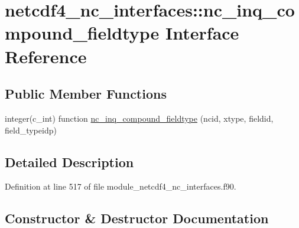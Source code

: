 \hypertarget{interfacenetcdf4__nc__interfaces_1_1nc__inq__compound__fieldtype}{}\section{netcdf4\+\_\+nc\+\_\+interfaces\+:\+:nc\+\_\+inq\+\_\+compound\+\_\+fieldtype Interface Reference}
\label{interfacenetcdf4__nc__interfaces_1_1nc__inq__compound__fieldtype}
\subsection*{Public Member Functions}
\begin{DoxyCompactItemize}
\item 
integer(c\+\_\+int) function \hyperlink{interfacenetcdf4__nc__interfaces_1_1nc__inq__compound__fieldtype_a01257488d89e470d1e3a7f025c80dd27}{nc\+\_\+inq\+\_\+compound\+\_\+fieldtype} (ncid, xtype, fieldid, field\+\_\+typeidp)
\end{DoxyCompactItemize}


\subsection{Detailed Description}


Definition at line 517 of file module\+\_\+netcdf4\+\_\+nc\+\_\+interfaces.\+f90.



\subsection{Constructor \& Destructor Documentation}
\mbox{\label{interfacenetcdf4__nc__interfaces_1_1nc__inq__compound__fieldtype_a01257488d89e470d1e3a7f025c80dd27}} 
